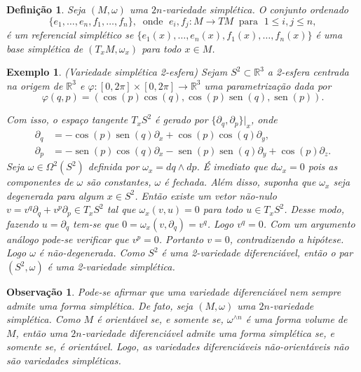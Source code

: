 \documentclass[12pt]{book}
\newtheorem{definicao}[teorema]{Definição}
\newtheorem{exemplo}[teorema]{Exemplo}
\newtheorem{observacao}[teorema]{Observação}
\DeclareMathOperator{\sen}{sen}
\newcommand{\derivadaparcialabrev}[1]{\partial_{#1}}
\newcommand{\espacotangenteponto}[2]{T_{#1}#2}
\newcommand{\real}[1]{\mathbb{R}^{#1}}
\begin{document}
	\begin{definicao}Seja $(M, \omega)$ uma $2n$-variedade simplética.
		O conjunto ordenado 
		$$
		\{e_{1}, \dots, e_{n}, f_{1},\dots , f_{n}\}, \;\;\text{onde }\; e_{i}, f_{j}:M\to TM
		\;\; \text{para }\;1\leq i,j\leq n,
		$$
		é um referencial simplético se $\{e_{1}(x), \dots, e_{n}(x), f_{1}(x),\dots , f_{n}(x)\}$ é uma base simplética de $(\espacotangenteponto{x}{M},\omega_{x})$ para todo $x\in M$.
	\end{definicao}
	
	\begin{exemplo}\label{exemplo_variedade_simpletica_esfera}
		(Variedade simplética 2-esfera) Sejam $S^{2} \subset \real{3}$ a 2-esfera centrada na origem de $\real{3}$ e $\varphi:[0,2\pi]\times [0,2\pi] \to \real{3}$ uma parametrização dada por 
		$$
		\varphi(q, p) = (\cos (p) \cos (q), \cos (p) \sen (q), \sen (p)).
		$$
		
		Com isso, o espaço tangente $T_{x}S^{2} $ é gerado por $ \{\derivadaparcialabrev{ q}, \derivadaparcialabrev{ p} \}|_{x}$, onde
		$$
		\begin{aligned}
		\derivadaparcialabrev{ q} &= -\cos (p)\sen (q) \derivadaparcialabrev{x}+ \cos (p)\cos (q) \derivadaparcialabrev{y},
		\\
		\derivadaparcialabrev{ p} &=  - \sen (p) \cos (q) 	\derivadaparcialabrev{x} - \sen (p) \sen (q) 	\derivadaparcialabrev{y} +\cos (p)				\derivadaparcialabrev{z}.
		\end{aligned} 
		$$
		Seja $\omega\in \Omega^{2}(S^{2})$ definida por $\omega_{x} = dq \wedge dp$. É imediato que $d\omega_{x} = 0$ pois as componentes de $\omega$ são constantes, $\omega$ é fechada. Além disso, suponha que $\omega_{x}$ seja degenerada para algum $x \in S^{2}$. Então existe um vetor não-nulo $v = v^{q}\partial_{q}+v^{p}\partial_{p} \in T_{x}S^{2}$ tal que $\omega_{x}(v, u)=0$ para todo $u\in T_{x}S^{2}$. Desse modo, fazendo $u = \partial_{q}$ tem-se que $0=\omega_{x}(v, \partial_{q}) = v^{q}$. Logo $v^{q}=0$. Com um argumento análogo pode-se verificar que $v^{p}=0$. Portanto $v=0$, contradizendo a hipótese. Logo $\omega$ é não-degenerada. Como $S^{2}$ é uma 2-variedade diferenciável, então o par $(S^{2}, \omega)$ é uma 2-variedade simplética.
	\end{exemplo}
	
	\begin{observacao}
		Pode-se afirmar que uma variedade diferenciável nem sempre admite uma forma simplética. De fato, seja $(M,\omega)$ uma $2n$-variedade simplética. Como $M$ é orientável se, e somente se, $\omega^{\wedge n}$ é uma forma volume de $M$, então uma $2n$-variedade diferenciável admite uma forma simplética se, e somente se, é orientável. Logo, as variedades diferenciáveis não-orientáveis não são variedades simpléticas.
	\end{observacao}
	
\end{document}
